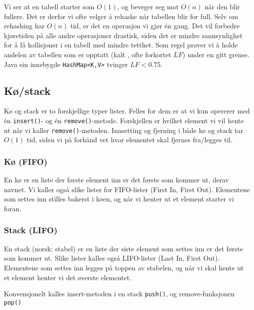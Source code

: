 Vi ser at en tabell starter som $ O(1) $, og beveger seg mot $ O(n) $ når den blir fullere. Det er derfor vi ofte velger å rehashe når tabellen blir for full. Selv om rehashing har $ O(n) $ tid, er det en operasjon vi gjør én gang. Det vil forbedre kjøretiden på alle andre operasjoner drastisk, siden det er mindre sannsynlighet for å få kollisjoner i en tabell med mindre tetthet. Som regel prøver vi å holde andelen av tabellen som er opptatt (kalt , ofte forkortet $ LF $) under en gitt grense. Java sin innebygde \verb|HashMap<K,V>| tvinger $ LF < 0.75 $.





\subsection{Kø/stack}
Kø og stack er to forskjellige typer lister. Felles for dem er at vi kun opererer med én \verb|insert()|- og én \verb|remove()|-metode. Forskjellen er hvilket element vi vil hente ut når vi kaller \verb|remove()|-metoden. Innsetting og fjerning i både kø og stack tar $ O(1) $ tid, siden vi på forhånd vet hvor elementet skal fjernes fra/legges til. 


\subsubsection{Kø (FIFO)}
En kø er en liste der første element inn er det første som kommer ut, derav navnet. Vi kaller også slike lister for FIFO-lister (First In, First Out). Elementene som settes inn stilles bakerst i køen, og når vi henter ut et element starter vi foran. 


\subsubsection{Stack (LIFO)}
En stack (norsk: stabel) er en liste der siste element som settes inn er det første som kommer ut. Slike lister kalles også LIFO-lister (Last In, First Out). Elementene som settes inn legges på toppen av stabelen, og når vi skal hente ut et element henter vi det øverste elementet. 

Konvensjonelt kalles insert-metoden i en stack \verb|push()|, og remove-funksjonen \verb|pop()|


